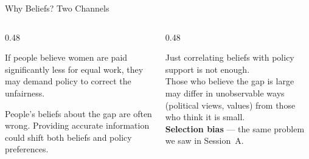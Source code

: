 \documentclass[aspectratio=169, 11pt]{beamer}
\begin{document}
\begin{frame}[t]{Why Beliefs? Two Channels}
\begin{columns}[T]
\begin{column}{0.48\textwidth}
\begin{examplebox}
If people believe women are paid significantly less for equal work, they may demand policy to correct the unfairness.
\end{examplebox}
\vspace{0.5em}
\begin{examplebox}
People's beliefs about the gap are often wrong. Providing accurate information could shift both beliefs and policy preferences.
\end{examplebox}
\end{column}
\begin{column}{0.48\textwidth}
\begin{warningbox}
Just correlating beliefs with policy support is not enough.\\[0.3em]
Those who believe the gap is large may differ in unobservable ways (political views, values) from those who think it is small.\\[0.3em]
\textbf{Selection bias} — the same problem we saw in Session~A.
\end{warningbox}
\end{column}
\end{columns}
\end{frame}

\end{document}
